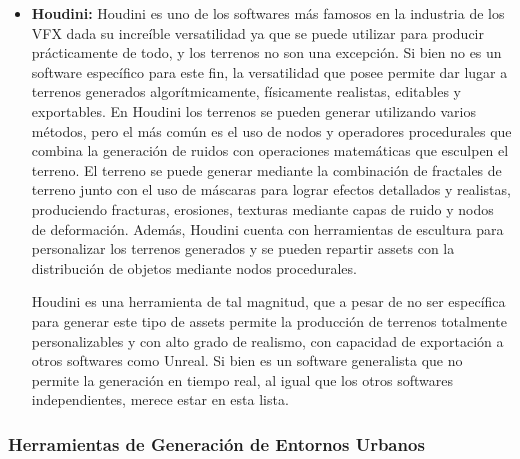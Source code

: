             \begin{itemize}[label=\textbullet]

                \item \textbf{Houdini:}
                Houdini es uno de los softwares más famosos en la industria de los VFX dada su increíble versatilidad ya que se puede utilizar para producir prácticamente de todo, y los terrenos no son una excepción. Si bien no es un software específico para este fin, la versatilidad que posee permite dar lugar a terrenos generados algorítmicamente, físicamente realistas, editables y exportables. En Houdini los terrenos se pueden generar utilizando varios métodos, pero el más común es el uso de nodos y operadores procedurales que combina la generación de ruidos con operaciones matemáticas que esculpen el terreno. El terreno se puede generar mediante la combinación de fractales de terreno junto con el uso de máscaras para lograr efectos detallados y realistas, produciendo fracturas, erosiones, texturas mediante capas de ruido y nodos de deformación. Además, Houdini cuenta con herramientas de escultura para personalizar los terrenos generados y se pueden repartir assets con la distribución de objetos mediante nodos procedurales.
                
                Houdini es una herramienta de tal magnitud, que a pesar de no ser específica para generar este tipo de assets permite la producción de terrenos totalmente personalizables y con alto grado de realismo, con capacidad de exportación a otros softwares como Unreal. Si bien es un software generalista que no permite la generación en tiempo real, al igual que los otros softwares independientes, merece estar en esta lista. \cite{sidefx} \cite{creativebloq}
            \end{itemize}

        \subsubsection{Herramientas de Generación de Entornos Urbanos}
        
